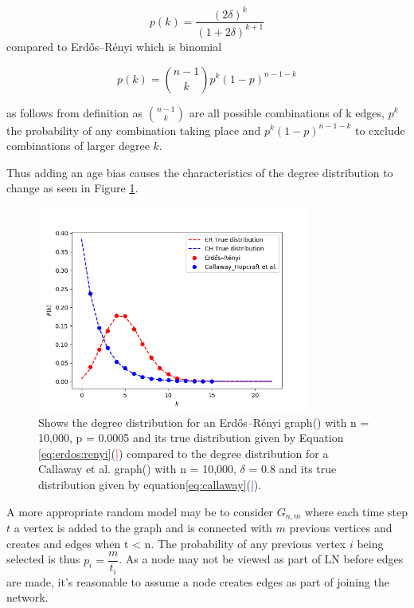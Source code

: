 \begin{equation}
	p(k) = \dfrac{(2\delta)^k}{(1 + 2\delta)^{k+1}} 
	\label{eq:callaway}
\end{equation}
compared to Erdős–Rényi which is binomial

\begin{equation}
	p(k) = {n-1 \choose k} p^k(1-p)^{n-1-k} 
	\label{eq:erdos:renyi}
\end{equation}

as follows from definition as ${n-1 \choose k}$ are all possible combinations of k edges,  $p^k$ the probability of any combination taking place and $p^k(1-p)^{n-1-k}$ to exclude combinations of larger degree $k$.

Thus adding an age bias causes the characteristics of the \gls{degree distribution} to change as seen in Figure \ref{fig:callaway:erdos}.

\begin{figure}[!htb]
		\hspace*{-0.5cm} 
	\centering
	\includegraphics[width=9cm]{images/random_topology_degree_distribution.png}
	\caption{Shows the degree distribution for an Erdős–Rényi graph(\tikzcircle[red, fill=red]{2pt}) with n = 10,000, p = 0.0005 and its true distribution given by Equation \ref{eq:erdos:renyi}(\textcolor{red}{|}) compared to the degree distribution for a Callaway et al. graph(\tikzcircle[blue, fill=blue]{2pt})  with n = 10,000, $\delta$ = 0.8 and its true distribution given by equation\ref{eq:callaway}(\textcolor{blue}{|}).
	}
	\label{fig:callaway:erdos}
		\hspace*{2mm} 
\end{figure}

A more appropriate random model may be to consider $G_{n,m}$ where each time step $t$ a vertex is added to the graph and is connected with $m$ previous vertices and creates and edges when t < n. The probability of any previous vertex $i$ being selected is thus $p_i = \dfrac{m}{t_i}$. 
As a node may not be viewed as part of LN before edges are made, it's reasonable to assume a node creates edges as part of joining the network.

